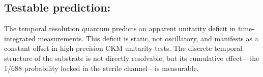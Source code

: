 \subsection*{Testable prediction:} 
The temporal resolution quantum predicts an apparent unitarity deficit in time-integrated measurements. This deficit is static, not oscillatory, and manifests as a constant offset in high-precision CKM unitarity tests. The discrete temporal structure of the substrate is not directly resolvable, but its cumulative effect—the 1/688 probability locked in the sterile channel—is measurable.